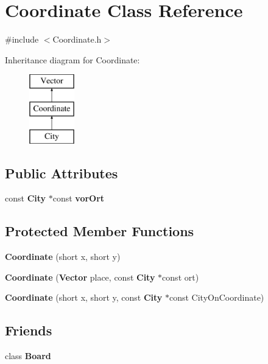 \section{Coordinate Class Reference}
\label{class_coordinate}


{\ttfamily \#include $<$Coordinate.\-h$>$}

Inheritance diagram for Coordinate\-:\begin{figure}[H]
\begin{center}
\leavevmode
\includegraphics[height=3.000000cm]{class_coordinate}
\end{center}
\end{figure}
\subsection*{Public Attributes}
\begin{DoxyCompactItemize}
\item 
const {\bf City} $\ast$const {\bf vor\-Ort}
\end{DoxyCompactItemize}
\subsection*{Protected Member Functions}
\begin{DoxyCompactItemize}
\item 
{\bf Coordinate} (short x, short y)
\item 
{\bf Coordinate} ({\bf Vector} place, const {\bf City} $\ast$const ort)
\item 
{\bf Coordinate} (short x, short y, const {\bf City} $\ast$const City\-On\-Coordinate)
\end{DoxyCompactItemize}
\subsection*{Friends}
\begin{DoxyCompactItemize}
\item 
class {\bfseries Board}\label{class_coordinate_a12525b6ed7c8186be0bee5cf78e2a49c}

\end{DoxyCompactItemize}
